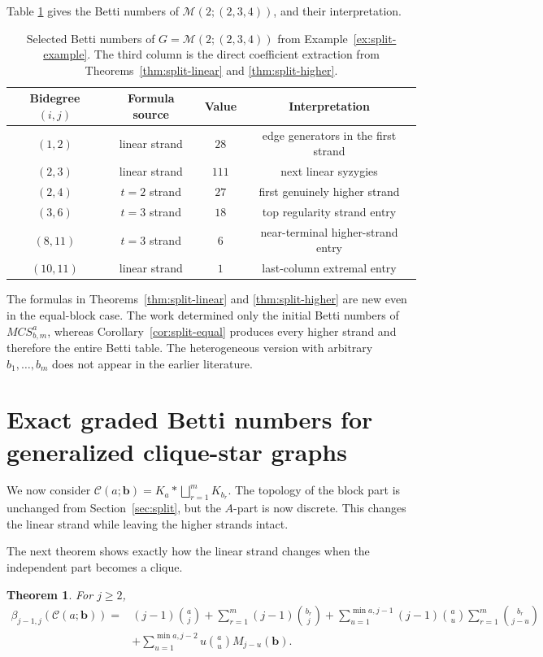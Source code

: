 \documentclass[12pt]{article}
\newtheorem{theorem}{Theorem}[section]
\theoremstyle{definition}
\theoremstyle{remark}
\newcommand{\MM}{\mathcal{M}}
\newcommand{\CC}{\mathcal{C}}
\newcommand{\bk}[1]{\mathbf{#1}}
\begin{document}
	
	Table \ref{tab:split-betti} gives the Betti numbers of $\MM(2;(2,3,4))$, and their interpretation.
	\begin{table}[H]
		\centering
		\caption{Selected Betti numbers of $G=\MM(2;(2,3,4))$ from Example~\ref{ex:split-example}. The third column is the direct coefficient extraction from Theorems~\ref{thm:split-linear} and \ref{thm:split-higher}.}
		\label{tab:split-betti}
		\begin{tabular}{@{}cccc@{}}
			\toprule
			Bidegree $(i,j)$ & Formula source & Value & Interpretation \\ \midrule
			$(1,2)$ & linear strand & $28$ & edge generators in the first strand \\
			$(2,3)$ & linear strand & $111$ & next linear syzygies \\
			$(2,4)$ & $t=2$ strand & $27$ & first genuinely higher strand \\
			$(3,6)$ & $t=3$ strand & $18$ & top regularity strand entry \\
			$(8,11)$ & $t=3$ strand & $6$ & near-terminal higher-strand entry \\
			$(10,11)$ & linear strand & $1$ & last-column extremal entry \\ \bottomrule
		\end{tabular}
	\end{table}
	
	 The formulas in Theorems~\ref{thm:split-linear} and \ref{thm:split-higher} are new even in the equal-block case. The work \cite{Rather2024} determined only the initial Betti numbers of $MCS^a_{b,m}$, whereas Corollary~\ref{cor:split-equal} produces every higher strand and therefore the entire Betti table. The heterogeneous version with arbitrary $b_1,\dots,b_m$ does not appear in the earlier literature.
	
	\section{Exact graded Betti numbers for generalized clique-star graphs}\label{sec:clique}
	We now consider 	$ \CC(a;\bk{b})=K_a * \bigsqcup_{r=1}^m K_{b_r}. $
	The topology of the block part is unchanged from Section~\ref{sec:split}, but the $A$-part is now discrete. This changes the linear strand while leaving the higher strands intact.
	
	 \medskip The next theorem shows exactly how the linear strand changes when the independent part becomes a clique.
	
	\begin{theorem}\label{thm:clique-linear}
		For $j\geq 2$,
		\begin{align*}
		 \beta_{j-1,j}(\CC(a;\bk{b}))=&
		(j-1)\binom{a}{j}
		+\sum_{r=1}^m (j-1)\binom{b_r}{j}
		+\sum_{u=1}^{\min{a,j-1}}
		(j-1)\binom{a}{u}\sum_{r=1}^m \binom{b_r}{j-u}\\
		&+\sum_{u=1}^{\min{a,j-2}}
		u\binom{a}{u}M_{j-u}(\bk{b}). 
		\end{align*}
	\end{theorem}
	
\end{document}
